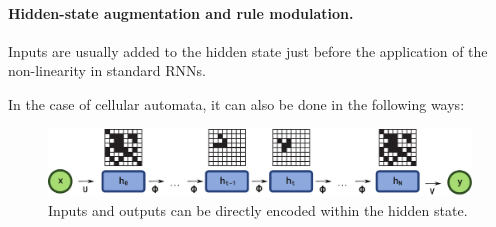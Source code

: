 \paragraph{Hidden-state augmentation and rule modulation.}
Inputs are usually added to the hidden state just before the application of the
non-linearity in standard RNNs.

In the case of cellular automata, it can also be done in the following ways:

\begin{figure}[ht]
  \centering
  \includegraphics[width=.9\linewidth]{figures/encode_decode.pdf}
  \caption{\label{fig:encode_decode} Inputs and outputs can be directly
    encoded within the hidden state.}
\end{figure}

